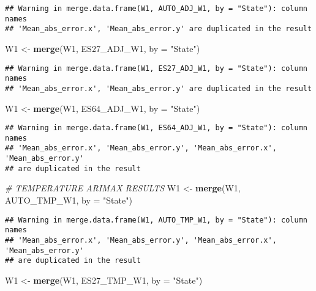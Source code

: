 \documentclass[
]{article}
\newenvironment{Shaded}{\begin{snugshade}}{\end{snugshade}}
\newcommand{\AttributeTok}[1]{\textcolor[rgb]{0.13,0.29,0.53}{#1}}
\newcommand{\CommentTok}[1]{\textcolor[rgb]{0.56,0.35,0.01}{\textit{#1}}}
\newcommand{\FunctionTok}[1]{\textcolor[rgb]{0.13,0.29,0.53}{\textbf{#1}}}
\newcommand{\NormalTok}[1]{#1}
\newcommand{\OtherTok}[1]{\textcolor[rgb]{0.56,0.35,0.01}{#1}}
\newcommand{\StringTok}[1]{\textcolor[rgb]{0.31,0.60,0.02}{#1}}
\begin{document}
\begin{verbatim}
## Warning in merge.data.frame(W1, AUTO_ADJ_W1, by = "State"): column names
## 'Mean_abs_error.x', 'Mean_abs_error.y' are duplicated in the result
\end{verbatim}

\begin{Shaded}
\begin{Highlighting}[]
\NormalTok{W1 }\OtherTok{\textless{}{-}} \FunctionTok{merge}\NormalTok{(W1, ES27\_ADJ\_W1, }\AttributeTok{by =} \StringTok{"State"}\NormalTok{)}
\end{Highlighting}
\end{Shaded}

\begin{verbatim}
## Warning in merge.data.frame(W1, ES27_ADJ_W1, by = "State"): column names
## 'Mean_abs_error.x', 'Mean_abs_error.y' are duplicated in the result
\end{verbatim}

\begin{Shaded}
\begin{Highlighting}[]
\NormalTok{W1 }\OtherTok{\textless{}{-}} \FunctionTok{merge}\NormalTok{(W1, ES64\_ADJ\_W1, }\AttributeTok{by =} \StringTok{"State"}\NormalTok{)}
\end{Highlighting}
\end{Shaded}

\begin{verbatim}
## Warning in merge.data.frame(W1, ES64_ADJ_W1, by = "State"): column names
## 'Mean_abs_error.x', 'Mean_abs_error.y', 'Mean_abs_error.x', 'Mean_abs_error.y'
## are duplicated in the result
\end{verbatim}

\begin{Shaded}
\begin{Highlighting}[]
\CommentTok{\# TEMPERATURE ARIMAX RESULTS}
\NormalTok{W1 }\OtherTok{\textless{}{-}} \FunctionTok{merge}\NormalTok{(W1, AUTO\_TMP\_W1, }\AttributeTok{by =} \StringTok{"State"}\NormalTok{)}
\end{Highlighting}
\end{Shaded}

\begin{verbatim}
## Warning in merge.data.frame(W1, AUTO_TMP_W1, by = "State"): column names
## 'Mean_abs_error.x', 'Mean_abs_error.y', 'Mean_abs_error.x', 'Mean_abs_error.y'
## are duplicated in the result
\end{verbatim}

\begin{Shaded}
\begin{Highlighting}[]
\NormalTok{W1 }\OtherTok{\textless{}{-}} \FunctionTok{merge}\NormalTok{(W1, ES27\_TMP\_W1, }\AttributeTok{by =} \StringTok{"State"}\NormalTok{)}
\end{Highlighting}
\end{Shaded}
\end{document}
